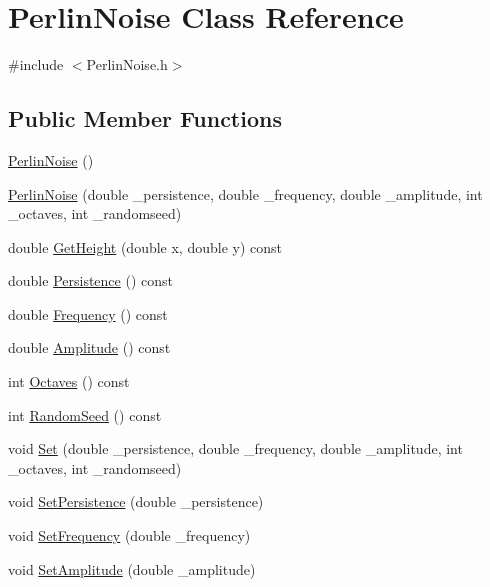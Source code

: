 \hypertarget{class_perlin_noise}{\section{Perlin\+Noise Class Reference}
\label{class_perlin_noise}
}


{\ttfamily \#include $<$Perlin\+Noise.\+h$>$}

\subsection*{Public Member Functions}
\begin{DoxyCompactItemize}
\item 
\hyperlink{class_perlin_noise_a1219657e8f3731aed347ba67d7b3cdcd}{Perlin\+Noise} ()
\item 
\hyperlink{class_perlin_noise_a3926062e9211b00fedd72b1b5d02a537}{Perlin\+Noise} (double \+\_\+persistence, double \+\_\+frequency, double \+\_\+amplitude, int \+\_\+octaves, int \+\_\+randomseed)
\item 
double \hyperlink{class_perlin_noise_a42bab5abb182be779578df722b32ee68}{Get\+Height} (double x, double y) const 
\item 
double \hyperlink{class_perlin_noise_ad0a82f6c8cd0b0b7a4d6d90bd1279fe8}{Persistence} () const 
\item 
double \hyperlink{class_perlin_noise_add09140662f5fadc3f1e0eec512a18d0}{Frequency} () const 
\item 
double \hyperlink{class_perlin_noise_a8f642423552f6a561e31f1a7053eb6bb}{Amplitude} () const 
\item 
int \hyperlink{class_perlin_noise_a099788d1c748e7704f21ffcfd004698d}{Octaves} () const 
\item 
int \hyperlink{class_perlin_noise_a43b043813ffb2e9546660bc21fa054cd}{Random\+Seed} () const 
\item 
void \hyperlink{class_perlin_noise_a8abb59af3f09c7109b43b208eb4a33c4}{Set} (double \+\_\+persistence, double \+\_\+frequency, double \+\_\+amplitude, int \+\_\+octaves, int \+\_\+randomseed)
\item 
void \hyperlink{class_perlin_noise_a6fc4a8c6d9be6b7139dfc5d9771321f5}{Set\+Persistence} (double \+\_\+persistence)
\item 
void \hyperlink{class_perlin_noise_adac1a028e0c19d621577ca4f2102820b}{Set\+Frequency} (double \+\_\+frequency)
\item 
void \hyperlink{class_perlin_noise_adfe9927f5f81906d06224289b428baf5}{Set\+Amplitude} (double \+\_\+amplitude)

\end{DoxyCompactItemize}
